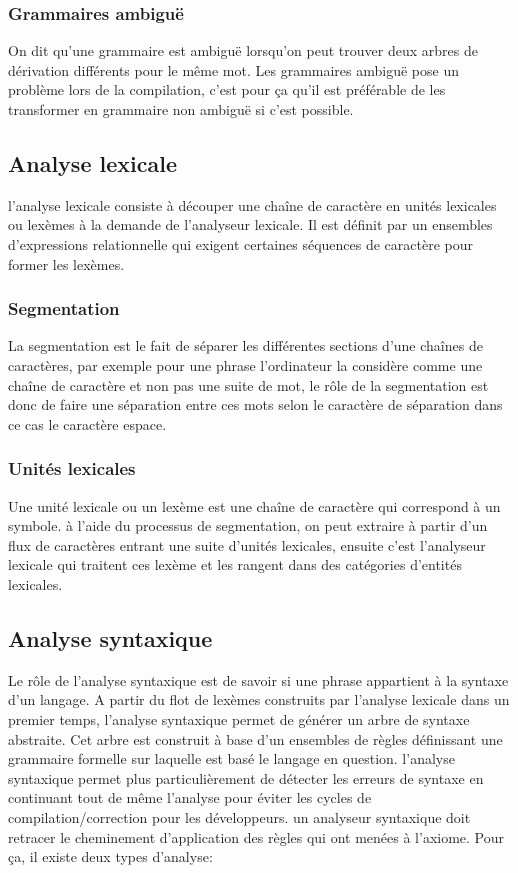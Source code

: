 \documentclass{article}
\begin{document}
\subsubsection{Grammaires ambiguë}
On dit qu’une grammaire est ambiguë  lorsqu’on peut trouver deux arbres de dérivation différents pour le même mot.
Les grammaires ambiguë pose un problème lors de la compilation, c’est pour ça qu’il est préférable de les transformer en grammaire non ambiguë si c’est possible.

\subsection{Analyse lexicale}
l’analyse lexicale consiste à découper une chaîne de caractère en unités lexicales ou lexèmes à la demande de l’analyseur lexicale.
Il est définit par un ensembles d’expressions relationnelle qui exigent certaines séquences de caractère pour former les lexèmes.

\subsubsection{Segmentation}
La segmentation est le fait de séparer les différentes sections d’une chaînes de caractères, par exemple pour une phrase l’ordinateur la considère comme une chaîne de caractère et non pas une suite de mot, le rôle de la segmentation est donc de faire une séparation entre ces mots selon le caractère de séparation dans ce cas le caractère espace.

\subsubsection{Unités lexicales}
Une unité lexicale ou un lexème est une chaîne de caractère qui correspond à un symbole. à l’aide du processus de segmentation, on peut extraire à partir d’un flux de caractères entrant une suite d’unités lexicales, ensuite c’est l’analyseur lexicale qui traitent ces lexème et les rangent dans des catégories d’entités lexicales.

\subsection{Analyse syntaxique}
Le rôle de l’analyse syntaxique est de savoir si une phrase appartient à la syntaxe d’un langage.
A partir du flot de lexèmes construits par l’analyse lexicale dans un premier temps, l’analyse syntaxique permet de générer un arbre de syntaxe abstraite.
Cet arbre est construit à base d’un ensembles de règles définissant une grammaire formelle sur laquelle est basé le langage en question.
l’analyse syntaxique permet plus particulièrement de détecter les erreurs de syntaxe en continuant tout de même l’analyse pour éviter les cycles de compilation/correction pour les développeurs.
un analyseur syntaxique doit retracer le cheminement d’application des règles qui ont menées à l’axiome. Pour ça, il existe deux types d’analyse:
\end{document}
